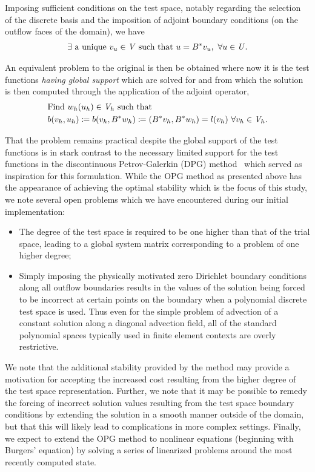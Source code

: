 \documentclass[]{article}
\begin{document}
Imposing sufficient conditions on the test space, notably regarding the
selection of the discrete basis and the imposition of adjoint boundary
conditions (on the outflow faces of the domain), we have
\begin{align}
  \exists\ \text{a unique}\ v_u \in \mathit{{{V}}}\ \text{such that}\ u = B^*v_u,\ \forall u \in \mathit{{{U}}}.
\end{align}

An equivalent problem to the original is then be obtained
where now it is the test functions \emph{having global
support} which are solved for and from which the solution is then computed
through the application of the adjoint operator,
\begin{align}
& \text{Find}\ w_h(u_h) \in \mathit{{{V}}}_h\ \text{such that}\\
& b(v_h,u_h) \coloneqq b(v_h,B^*w_h) \coloneqq (B^*v_h,B^*w_h) = l(v_h)\ \forall v_h \in \mathit{{{V}}}_h.
\end{align}

That the problem remains practical despite the global support of the test
functions is in stark contrast to the necessary limited support for the test
functions in the discontinuous Petrov-Galerkin (DPG) method~\cite{Demkowicz2010}
which served as inspiration for this formulation. While the OPG method as
presented above has the appearance of achieving the optimal stability which is
the focus of this study, we note several open problems which we have encountered
during our initial implementation:
\begin{itemize}
  \item The degree of the test space is required to be one higher than that of
    the trial space, leading to a global system matrix corresponding to a
    problem of one higher degree;
  \item Simply imposing the physically motivated zero Dirichlet boundary
    conditions along all outflow boundaries results in the values of the solution
    being forced to be incorrect at certain points on the boundary
    when a polynomial discrete test space is used. Thus even for the simple
    problem of advection of a constant solution along a diagonal advection
    field, all of the standard polynomial spaces typically used in finite
    element contexts are overly restrictive.
\end{itemize}

We note that the additional stability provided by the method may provide a
motivation for accepting the increased cost resulting from the higher degree of
the test space representation. Further, we note that it may be possible to
remedy the forcing of incorrect solution values resulting from the test space
boundary conditions by extending the solution in a smooth manner outside of the
domain, but that this will likely lead to complications in more complex
settings. Finally, we expect to extend the OPG method to nonlinear equations
(beginning with Burgers' equation) by solving a series of linearized problems
around the most recently computed state.



\end{document}
